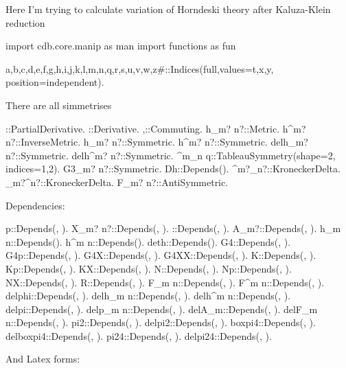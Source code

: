 \documentclass[10pt]{article}
\begin{document}
Here I'm trying to calculate variation of Horndeski theory after Kaluza-Klein reduction
\begin{python}
import cdb.core.manip as man
import functions as fun
\end{python}
\begin{python}
{a,b,c,d,e,f,g,h,i,j,k,l,m,n,q,r,s,u,v,w,z#}::Indices(full,values={t,x,y}, position=independent).
\end{python}
There are all simmetrises
\begin{python}
\partial{#}::PartialDerivative.
\nabla{#}::Derivative.
{\nabla{#},\partial{#}}::Commuting.
h_{m? n?}::Metric.
h^{m? n?}::InverseMetric.
h_{m? n?}::Symmetric.
h^{m? n?}::Symmetric.
delh_{m? n?}::Symmetric.
delh^{m? n?}::Symmetric.
\Gamma^{m}_{n q}::TableauSymmetry(shape={2}, indices={1,2}).
G3_{m? n?}::Symmetric.
Dh::Depends(\partial{#}).
\delta^{m?}_{n?}::KroneckerDelta.
\delta_{m?}^{n?}::KroneckerDelta.
F_{m? n?}::AntiSymmetric.
\end{python}
Dependencies:
\begin{python}
p::Depends(\nabla{#}, \partial{#}).
X_{m? n?}::Depends(\nabla{#}, \partial{#}).
\phi::Depends(\nabla{#}, \partial{#}).
A_{m?}::Depends(\nabla{#}, \partial{#}).
h_{m n}::Depends(\partial{#}).
h^{m n}::Depends(\partial{#}).
deth::Depends(\partial{#}).
G4::Depends(\nabla{#}, \partial{#}).
G4p::Depends(\nabla{#}, \partial{#}).
G4X::Depends(\nabla{#}, \partial{#}).
G4XX::Depends(\nabla{#}, \partial{#}).
K::Depends(\nabla{#}, \partial{#}).
Kp::Depends(\nabla{#}, \partial{#}).
KX::Depends(\nabla{#}, \partial{#}).
N::Depends(\nabla{#}, \partial{#}).
Np::Depends(\nabla{#}, \partial{#}).
NX::Depends(\nabla{#}, \partial{#}).
R::Depends(\nabla{#}, \partial{#}).
F_{m n}::Depends(\nabla{#}, \partial{#}).
F^{m n}::Depends(\nabla{#}, \partial{#}).
delphi::Depends(\nabla{#}, \partial{#}).
delh_{m n}::Depends(\nabla{#}, \partial{#}).
delh^{m n}::Depends(\nabla{#}, \partial{#}).
delpi::Depends(\nabla{#}, \partial{#}).
delp_{m n}::Depends(\nabla{#}, \partial{#}).
delA_{m}::Depends(\nabla{#}, \partial{#}).
delF_{m n}::Depends(\nabla{#}, \partial{#}).
pi2::Depends(\nabla{#}, \partial{#}).
delpi2::Depends(\nabla{#}, \partial{#}).
boxpi4::Depends(\nabla{#}, \partial{#}).
delboxpi4::Depends(\nabla{#}, \partial{#}).
pi24::Depends(\nabla{#}, \partial{#}).
delpi24::Depends(\nabla{#}, \partial{#}).
\end{python}
And Latex forms:
\end{document}
